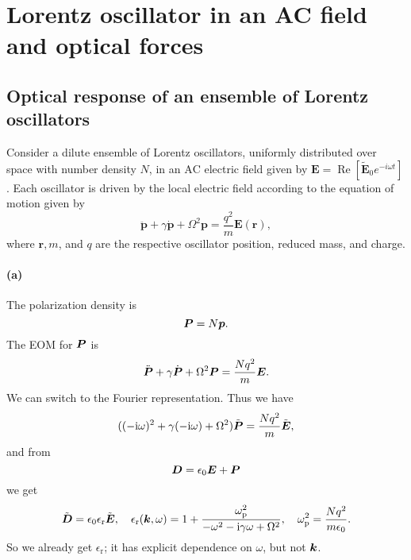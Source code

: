 \documentclass[hyperref, a4paper]{article}
\newcommand*{\ii}{\mathrm{i}}
\newcommand*{\omegap}{\omega_{\text{p}}}
\newcommand{\epsr}{\epsilon_{\text{r}}}
\newcommand{\Efreq}{\tilde{\vb*{E}}}
\newcommand{\Dfreq}{\tilde{\vb*{D}}}
\begin{document}
\section{Lorentz oscillator in an AC field and optical forces}

\subsection{Optical response of an ensemble of Lorentz oscillators}

Consider a dilute ensemble of Lorentz oscillators, uniformly distributed over space with number density $N$, in an $\mathrm{AC}$ electric field given by $\mathbf{E}=\operatorname{Re}\left[\tilde{\mathbf{E}}_0 e^{-i \omega t}\right]$. Each oscillator is driven by the local electric field according to the equation of motion given by
$$
\ddot{\mathbf{p}}+\gamma \dot{\mathbf{p}}+\Omega^2 \mathbf{p}=\frac{q^2}{m} \mathbf{E}(\mathbf{r}),
$$
where $\mathbf{r}, m$, and $q$ are the respective oscillator position, reduced mass, and charge.

\paragraph{(a)}
The polarization density is 
\begin{equation}
    \vb*{P} = N \vb*{p}.
\end{equation}
The EOM for $\vb*{P}$ is 
\begin{equation}
    \ddot{\vb*{P}} + \gamma \dot{\vb*{P}} + \Omega^2 \vb*{P} = \frac{N q^2}{m} \vb*{E}.
\end{equation}
We can switch to the Fourier representation.
Thus we have 
\begin{equation}
    ((-\ii \omega)^2 + \gamma (- \ii \omega) + \Omega^2) \tilde{\vb*{P}} = \frac{N q^2}{m} \Efreq,
\end{equation}
and from 
\begin{equation}
    \vb*{D} = \epsilon_0 \vb*{E} + \vb*{P}
\end{equation}
we get 
\begin{equation}
    \Dfreq = \epsilon_0 \epsr \Efreq, \quad 
    \epsr(\vb*{k}, \omega) = 1 + \frac{\omegap^2}{- \omega^2 - \ii \gamma \omega + \Omega^2}, \quad 
    \omegap^2 = \frac{N q^2}{m \epsilon_0}.
    \label{eq:harmonic-oscillator-epsilon}
\end{equation}
So we already get $\epsr$; it has explicit dependence on $\omega$,
but not $\vb*{k}$.
\end{document}
